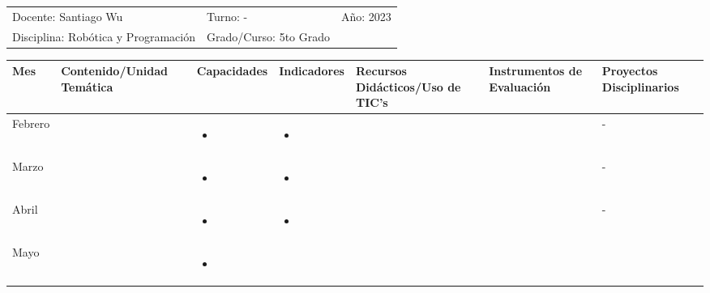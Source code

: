 \documentclass[landscape, a4paper, 10pt]{article}
\newcommand{\smallcellwidth}{0.7in}
\newcommand{\normalcellwidth}{1.2in}
\newcommand{\bigcellwidth}{2.0in}
\newcommand{\profesor}{Santiago Wu}
\newcommand{\discipline}{Robótica y Programación}
\newcommand{\currentyear}{2023}
\begin{document}
	\begin{tabularx}{\textwidth}{ >{\raggedright\arraybackslash}X >{\raggedright\arraybackslash}X >{\raggedright\arraybackslash}X }
		Docente: \profesor &
		Turno: - &
		Año: \currentyear \\
		Disciplina: \discipline &
		Grado/Curso: 5to Grado &
		 \\
	\end{tabularx}
	\centering
	\begin{longtable}{|m{\smallcellwidth}|p{\normalcellwidth}|p{\bigcellwidth}|p{\bigcellwidth}|p{\normalcellwidth}|p{\normalcellwidth}|p{\normalcellwidth}|}
		\hline
		\textbf{Mes} &
		\textbf{Contenido/Unidad Temática} &
		\textbf{Capacidades} &
		\textbf{Indicadores} &
		\textbf{Recursos Didácticos/Uso de TIC's} &
		\textbf{Instrumentos de Evaluación} &
		\textbf{Proyectos Disciplinarios} \\
		\hline
		\endhead
		Febrero &
		 &
		\begin{itemize}
			\item 
		\end{itemize} &
		\begin{itemize}
			\item 
		\end{itemize} &
		  &
		  &
		 - \\
		\hline
		Marzo &
		 &
		\begin{itemize}
			\item 
		\end{itemize} &
		\begin{itemize}
			\item 
		\end{itemize} &
		  &
		  &
		 - \\
		\hline
		Abril &
		 &
		\begin{itemize}
			\item 
		\end{itemize} &
		\begin{itemize}
			\item 
		\end{itemize} &
		  &
		  &
		 - \\
		\hline
		Mayo &
		 &
		\begin{itemize}
			\item 
		\end{itemize} &
		\begin{itemize}

\end{itemize}
\end{longtable}
\end{document}
